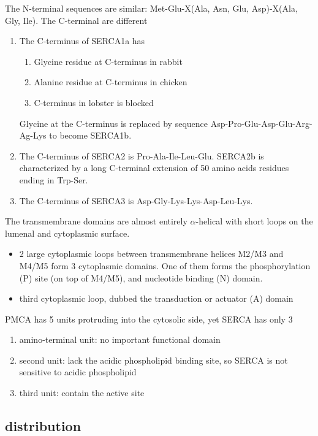 The N-terminal sequences are similar: Met-Glu-X(Ala, Asn, Glu, Asp)-X(Ala, Gly,
Ile). The C-terminal are different
\begin{enumerate}
  \item The C-terminus of SERCA1a has \citep{martonosi2003} 
  \begin{enumerate}
    \item Glycine residue at C-terminus in rabbit
    \item Alanine residue at C-terminus in chicken
    \item C-terminus in lobster is blocked
  \end{enumerate}
  Glycine at the C-terminus is replaced by sequence
  Asp-Pro-Glu-Asp-Glu-Arg-Ag-Lys to become SERCA1b. 
  
  \item The C-terminus of SERCA2 is Pro-Ala-Ile-Leu-Glu. SERCA2b is
  characterized by a long C-terminal extension of 50 amino acids residues ending
  in Trp-Ser. 
  \item The C-terminus of SERCA3 is Asp-Gly-Lys-Lys-Asp-Leu-Lys.
\end{enumerate}

The transmembrane domains are almost entirely $\alpha$-helical with short loops
on the lumenal and cytoplasmic surface.
\begin{itemize}
\item 2 large cytoplasmic loops between transmembrane helices M2/M3
  and M4/M5 form 3 cytoplasmic domains. One of them forms the
  phosphorylation (P) site (on top of M4/M5), and nucleotide binding
  (N) domain.

\item third cytoplasmic loop, dubbed the transduction or actuator (A)
  domain
\end{itemize}

PMCA has 5 units protruding into the cytosolic side, yet SERCA has only 3
\begin{enumerate}
  \item amino-terminal unit: no important functional domain
  \item second unit: lack the acidic phospholipid binding site, so SERCA is not
  sensitive to acidic phospholipid
  \item third unit: contain the active site
\end{enumerate}

\subsection{distribution}
\label{sec:SERCA-distribution}

